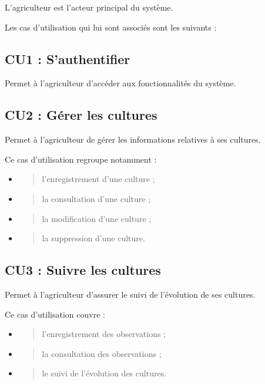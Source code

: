 L'agriculteur est l'acteur principal du système.

Les cas d'utilisation qui lui sont associés sont les suivants :

\hypertarget{cu1-sauthentifier}{%
\subsection{CU1 : S'authentifier}\label{cu1-sauthentifier}}

Permet à l'agriculteur d'accéder aux fonctionnalités du système.

\hypertarget{cu2-guxe9rer-les-cultures}{%
\subsection{CU2 : Gérer les cultures}\label{cu2-guxe9rer-les-cultures}}

Permet à l'agriculteur de gérer les informations relatives à ses
cultures.

Ce cas d'utilisation regroupe notamment :

\begin{itemize}
\item
  \begin{quote}
  l'enregistrement d'une culture ;
  \end{quote}
\item
  \begin{quote}
  la consultation d'une culture ;
  \end{quote}
\item
  \begin{quote}
  la modification d'une culture ;
  \end{quote}
\item
  \begin{quote}
  la suppression d'une culture.
  \end{quote}
\end{itemize}

\hypertarget{cu3-suivre-les-cultures}{%
\subsection{CU3 : Suivre les cultures}\label{cu3-suivre-les-cultures}}

Permet à l'agriculteur d'assurer le suivi de l'évolution de ses
cultures.

Ce cas d'utilisation couvre :

\begin{itemize}
\item
  \begin{quote}
  l'enregistrement des observations ;
  \end{quote}
\item
  \begin{quote}
  la consultation des observations ;
  \end{quote}
\item
  \begin{quote}
  le suivi de l'évolution des cultures.
  \end{quote}
\end{itemize}

